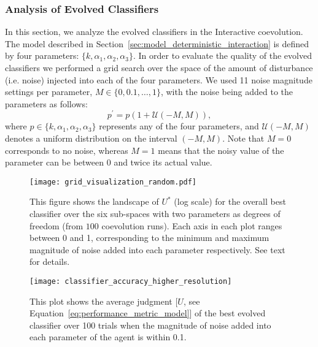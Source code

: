 \subsubsection{Analysis of Evolved Classifiers}\label{sec: analysis_evolved_classifiers_deterministic_interaction}

In this section, we analyze the evolved classifiers in the Interactive coevolution. The model described in Section~\ref{sec:model_deterministic_interaction} is defined by four parameters: $\{ k, \alpha_1, \alpha_2,\alpha_3 \}$. In order to evaluate the quality of the evolved classifiers we performed a grid search over the space of the amount of disturbance (i.e. noise) injected into each of the four parameters. We used 11 noise magnitude settings per parameter, $M\in\{0, 0.1, \dots, 1\}$, with the noise being added to the parameters as follows:
\begin{equation}\label{eq:noise_on_magnitudes}
p^{\prime} = p(1 + \mathcal{U}(-M, M)),
\end{equation}
where $p\in\{ k, \alpha_1, \alpha_2,\alpha_3 \}$ represents any of the four parameters, and $\mathcal{U}(-M,M)$ denotes a uniform distribution on the interval $(-M,M)$. Note that $M=0$ corresponds to no noise, whereas $M=1$ means that the noisy value of the parameter can be between $0$ and twice its actual value.

\begin{figure}[!t]
	\centering
			\texttt{[image: grid\_visualization\_random.pdf]}
		\caption{This figure shows the landscape of $U^{*}$ (log scale) for the overall best classifier over the six sub-spaces with two parameters as degrees of freedom (from $100$ coevolution runs). Each axis in each plot ranges between 0 and 1, corresponding to the minimum and maximum magnitude of noise added into each parameter respectively. See text for details.\label{fig:grid_search}}
\end{figure}

\begin{figure}[!t]
		\centering
		\texttt{[image: classifier\_accuracy\_higher\_resolution]}
		\caption{This plot shows the average judgment [$U$, see Equation~\ref{eq:performance_metric_model}] of the best evolved classifier over 100 trials when the magnitude of noise added into each parameter of the agent is within 0.1.\label{fig:classifier_accuracy_higher_resolution}}
\end{figure}

